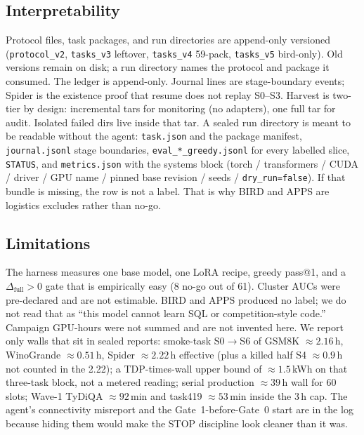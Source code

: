 \subsection{Interpretability}
\label{p2:interp}
Protocol files, task packages, and run directories are
append-only versioned (\texttt{protocol\_v2}, \texttt{tasks\_v3}
leftover, \texttt{tasks\_v4} 59-pack, \texttt{tasks\_v5}
bird-only). Old versions remain on disk; a run directory names
the protocol and package it consumed.
The ledger is append-only. Journal lines are stage-boundary
events; Spider is the existence proof that resume does not replay
S0--S3.
Harvest is two-tier by design: incremental tars for monitoring
(no adapters), one full tar for audit. Isolated failed dirs live
inside that tar.
A sealed run directory is meant to be readable without the agent:
\texttt{task.json} and the package manifest, \texttt{journal.jsonl}
stage boundaries, \texttt{eval\_*\_greedy.jsonl} for every labelled
slice, \texttt{STATUS}, and \texttt{metrics.json} with the systems
block (torch / transformers / CUDA / driver / GPU name / pinned
base revision / seeds / \texttt{dry\_run=false}).
If that bundle is missing, the row is not a label. That is why
BIRD and APPS are logistics excludes rather than no-go.

\subsection{Limitations}
\label{p2:lim}
The harness measures one base model, one LoRA recipe, greedy
pass@1, and a $\Delta_{\mathrm{full}}>0$ gate that is empirically
easy (8 no-go out of 61).
Cluster AUCs were pre-declared and are not estimable.
BIRD and APPS produced no label; we do not read that as ``this
model cannot learn SQL or competition-style code.''
Campaign GPU-hours were not summed and are not invented here.
We report only walls that sit in sealed reports: smoke-task
S0$\to$S6 of GSM8K $\approx 2.16$\,h, WinoGrande $\approx 0.51$\,h,
Spider $\approx 2.22$\,h effective (plus a killed half S4
$\approx 0.9$\,h not counted in the 2.22); a TDP-times-wall
upper bound of $\approx 1.5$\,kWh on that three-task block, not a
metered reading; serial production $\approx 39$\,h wall for 60
slots; Wave-1 TyDiQA $\approx 92$\,min and task419 $\approx 53$\,min
inside the 3\,h cap.
The agent's connectivity misreport and the Gate~1-before-Gate~0
start are in the log because hiding them would make the STOP
discipline look cleaner than it was.
